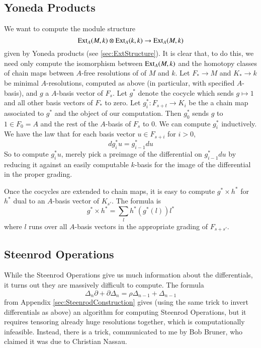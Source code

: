 \subsection{Yoneda Products}

We want to compute the module structure
\[\operatorname{Ext}\nolimits_A(M,k)\otimes \operatorname{Ext}\nolimits_A(k,k)\to \operatorname{Ext}\nolimits_A(M,k)\]
given by Yoneda products (see \ref{sec:ExtStructure}).
It is clear that, to do this, we need only compute the isomorphism  between $\operatorname{Ext}\nolimits_A(M,k)$ and the homotopy classes of chain maps between $A$-free resolutions of of $M$ and $k$.
Let $F_*\to M$ and $K_*\to k$ be minimal $A$-resolutions, computed as above (in particular, with specified $A$-basis), and $g$ a $A$-basis vector of $F_s$. 
Let $g^*$ denote the cocycle which sends $g\mapsto 1$ and all other basis vectors of $F_*$ to zero.
Let $g^*_i:F_{s+t}\to K_i$ be the a chain map associated to $g^*$ and the object of our computation.
Then $g^*_0$ sends $g$ to $1\in F_0=A$ and the rest of the  $A$-basis of $F_s$ to 0.  
We can compute $g^*_i$ inductively.  
We have the law that for each basis vector $u\in F_{s+i}$ for $i> 0$,
\[dg^*_iu=g^*_{i-1}du\]
So to compute $g^*_iu$, merely pick a preimage of the differential on $g^*_{i-1}du$ by reducing it against an easily computable $k$-basis for the image of the differential in the proper grading.  

Once the cocycles are extended to chain maps, it is easy to compute $g^*\times h^*$ for $h^*$ dual to an $A$-basis vector of $K_{s'}$.  
The formula is
\[g^*\times h^* = \sum_l h^*(g^*(l)) l^*\]
where $l$ runs over all $A$-basis vectors in the appropriate grading of $F_{s+s'}$.  

\subsection{Steenrod Operations}

While the Steenrod Operations give us much information about the differentials, it turns out they are massively difficult to compute.
The formula
\[\Delta_n\partial + \partial\Delta_n = \rho\Delta_{n-1}+\Delta_{n-1}\]
from Appendix \ref{sec:SteenrodConstruction} gives (using the same trick to invert differentials as above) an algorithm for computing Steenrod Operations, but it requires tensoring already huge resolutions together, which is computationally infeasible.  
Instead, there is a trick, communicated to me by Bob Bruner, who claimed it was due to Christian Nassau.

